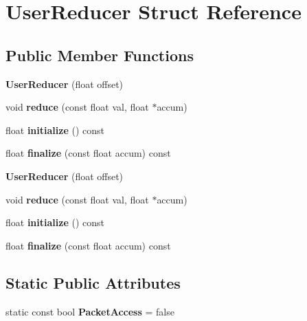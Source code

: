 \hypertarget{struct_user_reducer}{}\section{User\+Reducer Struct Reference}
\label{struct_user_reducer}
\subsection*{Public Member Functions}
\begin{DoxyCompactItemize}
\item 
\mbox{\label{struct_user_reducer_ace8010b8cc4a4d91a7b1a764dd7ce488}} 
{\bfseries User\+Reducer} (float offset)
\item 
\mbox{\label{struct_user_reducer_afb0b05dc132abd2ef1c2728d633556ef}} 
void {\bfseries reduce} (const float val, float $\ast$accum)
\item 
\mbox{\label{struct_user_reducer_afcce2c766337c8b7550671f9220aabc3}} 
float {\bfseries initialize} () const
\item 
\mbox{\label{struct_user_reducer_a3e043988fdf9e3d0d1e1147c1614526a}} 
float {\bfseries finalize} (const float accum) const
\item 
\mbox{\label{struct_user_reducer_ace8010b8cc4a4d91a7b1a764dd7ce488}} 
{\bfseries User\+Reducer} (float offset)
\item 
\mbox{\label{struct_user_reducer_afb0b05dc132abd2ef1c2728d633556ef}} 
void {\bfseries reduce} (const float val, float $\ast$accum)
\item 
\mbox{\label{struct_user_reducer_afcce2c766337c8b7550671f9220aabc3}} 
float {\bfseries initialize} () const
\item 
\mbox{\label{struct_user_reducer_a3e043988fdf9e3d0d1e1147c1614526a}} 
float {\bfseries finalize} (const float accum) const
\end{DoxyCompactItemize}
\subsection*{Static Public Attributes}
\begin{DoxyCompactItemize}
\item 
\mbox{\label{struct_user_reducer_a12d83cdaad3e9cd6297bfe173bb46b5d}} 
static const bool {\bfseries Packet\+Access} = false
\end{DoxyCompactItemize}



